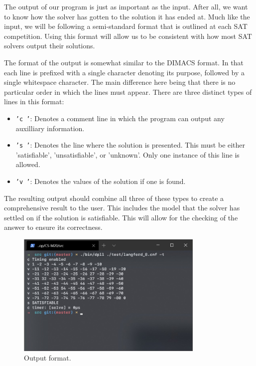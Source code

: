 \documentclass{article}
\begin{document}
The output of our program is just as important as the input. After all, we want to know how the
solver has gotten to the solution it has ended at. Much like the input, we will be following a
semi-standard format that is outlined at each SAT competition. Using this format will allow us to be
consistent with how most SAT solvers output their solutions.

The format of the output is somewhat similar to the DIMACS format. In that each line is prefixed
with a single character denoting its purpose, followed by a single whitespace character. The main
difference here being that there is no particular order in which the lines must appear. There are
three distinct types of lines in this format:

\begin{itemize}
    \item \texttt{'c '}: Denotes a comment line in which the program can output any auxilliary
          information.
    \item \texttt{'s '}: Denotes the line where the solution is presented. This must be either
          'satisfiable', 'unsatisfiable', or 'unknown'. Only one instance of this line is allowed.
    \item \texttt{'v '}: Denotes the values of the solution if one is found.
\end{itemize}

The resulting output should combine all three of these types to create a comprehensive result to the
user. This includes the model that the solver has settled on if the solution is satisfiable. This
will allow for the checking of the answer to ensure its correctness.

\begin{figure}[h]
    \centering
    \includegraphics[width=0.8\textwidth]{output_example.jpg}
    \caption{Output format.}
\end{figure}
\end{document}
